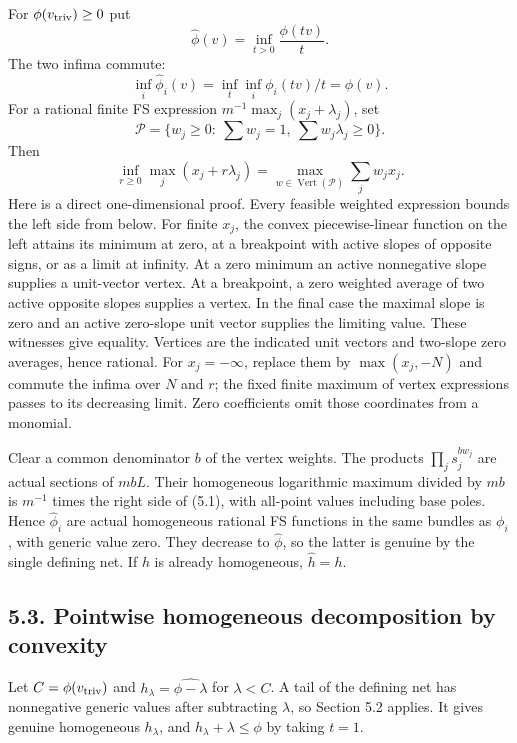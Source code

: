 \documentclass[
  10pt,
]{article}
\begin{document}
For \(\phi(v_{\rm triv})\geq0\) put
\[\widehat\phi(v)=\inf_{t>0}\frac{\phi(tv)}t.\] The two infima commute:
\[\inf_i\widehat\phi_i(v)=\inf_t\inf_i\phi_i(tv)/t=\widehat\phi(v).\]
For a rational finite FS expression \(m^{-1}\max_j(x_j+\lambda_j)\), set
\[\mathscr P=\{w_j\geq0:\ \sum w_j=1,\ \sum w_j\lambda_j\geq0\}.\] Then
\[\inf_{r\geq0}\max_j(x_j+r\lambda_j)
=\max_{w\in\operatorname{Vert}(\mathscr P)}\sum_jw_jx_j.       \tag{5.1}\]
Here is a direct one-dimensional proof. Every feasible weighted
expression bounds the left side from below. For finite \(x_j\), the
convex piecewise-linear function on the left attains its minimum at
zero, at a breakpoint with active slopes of opposite signs, or as a
limit at infinity. At a zero minimum an active nonnegative slope
supplies a unit-vector vertex. At a breakpoint, a zero weighted average
of two active opposite slopes supplies a vertex. In the final case the
maximal slope is zero and an active zero-slope unit vector supplies the
limiting value. These witnesses give equality. Vertices are the
indicated unit vectors and two-slope zero averages, hence rational. For
\(x_j=-\infty\), replace them by \(\max(x_j,-N)\) and commute the infima
over \(N\) and \(r\); the fixed finite maximum of vertex expressions
passes to its decreasing limit. Zero coefficients omit those coordinates
from a monomial.

Clear a common denominator \(b\) of the vertex weights. The products
\(\prod_j s_j^{bw_j}\) are actual sections of \(mbL\). Their homogeneous
logarithmic maximum divided by \(mb\) is \(m^{-1}\) times the right side
of (5.1), with all-point values including base poles. Hence
\(\widehat\phi_i\) are actual homogeneous rational FS functions in the
same bundles as \(\phi_i\), with generic value zero. They decrease to
\(\widehat\phi\), so the latter is genuine by the single defining net.
If \(h\) is already homogeneous, \(\widehat h=h\).

\subsection{5.3. Pointwise homogeneous decomposition by
convexity}\label{pointwise-homogeneous-decomposition-by-convexity}

Let \(C=\phi(v_{\rm triv})\) and \(h_\lambda=\widehat{\phi-\lambda}\)
for \(\lambda<C\). A tail of the defining net has nonnegative generic
values after subtracting \(\lambda\), so Section 5.2 applies. It gives
genuine homogeneous \(h_\lambda\), and \(h_\lambda+\lambda\leq\phi\) by
taking \(t=1\).
\end{document}

